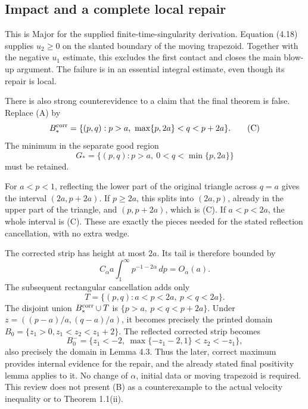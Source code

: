 \documentclass[10pt]{article}
\begin{document}
\subsection*{Impact and a complete local repair}
This is Major for the supplied finite-time-singularity derivation. Equation (4.18) supplies \(u_2\ge0\) on the slanted boundary of the moving trapezoid. Together with the negative \(u_1\) estimate, this excludes the first contact and closes the main blow-up argument. The failure is in an essential integral estimate, even though its repair is local.\par
There is also strong counterevidence to a claim that the final theorem is false. Replace (A) by \[B_*^{\rm corr}
   =\{(p,q):p>a,\ \max\{p,2a\}<q<p+2a\}.
 \tag{C}\] The minimum in the separate good region \[G_*=\{(p,q):p>a,\ 0<q<\min\{p,2a\}\}\] must be retained.\par
For \(a<p<1\), reflecting the lower part of the original triangle across \(q=a\) gives the interval \((2a,p+2a)\). If \(p\ge2a\), this splits into \((2a,p)\), already in the upper part of the triangle, and \((p,p+2a)\), which is (C). If \(a<p<2a\), the whole interval is (C). These are exactly the pieces needed for the stated reflection cancellation, with no extra wedge.\par
The corrected strip has height at most \(2a\). Its tail is therefore bounded by \[C_\alpha a\int_1^\infty p^{-1-2\alpha}\,dp
 =O_\alpha(a).\] The subsequent rectangular cancellation adds only \[T=\{(p,q):a<p<2a,\ p<q<2a\}.\] The disjoint union \(B_*^{\rm corr}\cup T\) is \(\{p>a,\ p<q<p+2a\}\). Under \(z=((p-a)/a,(q-a)/a)\), it becomes precisely the printed domain \(B_0=\{z_1>0,z_1<z_2<z_1+2\}\). The reflected corrected strip becomes \[B_0^-=
 \{z_1<-2,\ \max\{-z_1-2,1\}<z_2<-z_1\},\] also precisely the domain in Lemma 4.3. Thus the later, correct maximum provides internal evidence for the repair, and the already stated final positivity lemma applies to it. No change of \(\alpha\), initial data or moving trapezoid is required. This review does not present (B) as a counterexample to the actual velocity inequality or to Theorem 1.1(ii).\par
\end{document}
